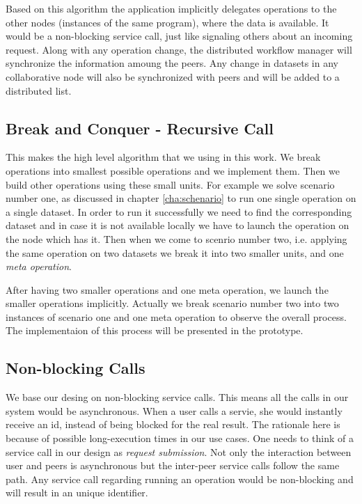 Based on this algorithm the application implicitly delegates operations to the other 
nodes (instances of the same program), where the data is available. 
It would be a non-blocking service call, 
just like signaling others about an incoming request.
Along with any operation change, the distributed workflow manager will synchronize the information amoung the peers.
Any change in datasets in any collaborative node will also be synchronized with peers and will be added to 
a distributed list.

\subsection{Break and Conquer - Recursive Call}
This makes the high level algorithm that we using in this work. We break operations into smallest possible operations
and we implement them. Then we build other operations using these small units. For example we solve scenario number one, as
discussed in chapter \ref{cha:schenario} to run one single operation on a single dataset.
In order to run it successfully we need to find the corresponding dataset and in case it is not available locally we have
to launch the operation on the node which has it. Then when we come to scenrio number two, i.e. applying the same operation
on two datasets we break it into two smaller units, and one \textit{meta operation}.

After having two smaller operations and one meta operation, we launch the smaller operations implicitly. Actually we break
scenario number two into two instances of scenario one and one meta operation to observe the overall process. The implementaion
of this process will be presented in the prototype.

\subsection{Non-blocking Calls}
We base our desing on non-blocking service calls. This means all the calls in our system would be asynchronous.
When a user calls a servie, she would instantly receive an id, instead of being blocked for the real result.
The rationale here is because of possible long-execution times in our use cases. 
One needs to think of a service call in our design as \textit{request submission}. 
Not only the interaction between user and peers is asynchronous but the inter-peer service calls follow the same path.
Any service call regarding running an operation would be non-blocking and will result in an unique identifier.

